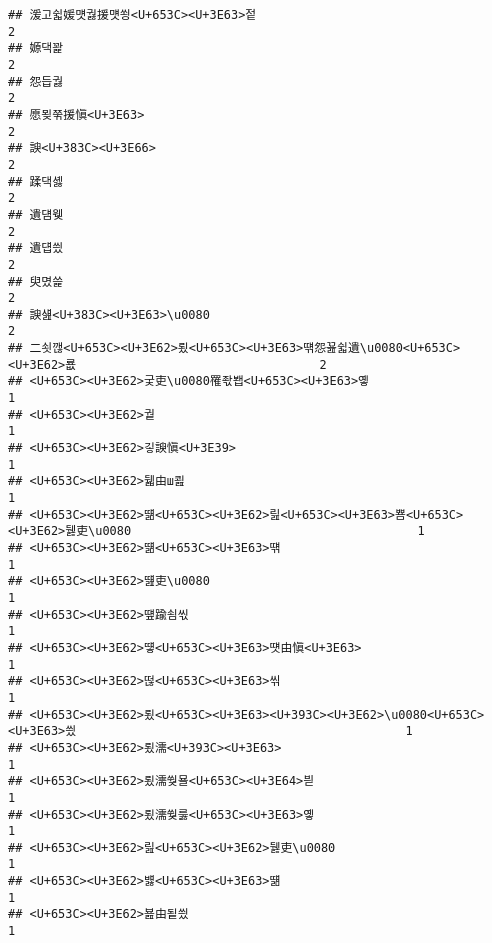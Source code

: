 \documentclass[]{article}
\begin{document}
\begin{verbatim}
## 湲고쉷媛먯궗援먯쑁<U+653C><U+3E63>젙                                                2
## 嫄댁꽕                                                                  2
## 怨듭궗                                                                  2
## 愿묒쭊援愼<U+3E63>                                                            2
## 諛<U+383C><U+3E66>                                                                  2
## 蹂댁셿                                                                  2
## 遺덈웾                                                                  2
## 遺덉씠                                                                  2
## 臾몄쓽                                                                  2
## 諛섎<U+383C><U+3E63>\u0080                                                          2
## 二쇳깮<U+653C><U+3E62>룄<U+653C><U+3E63>떆怨꾪쉷遺\u0080<U+653C><U+3E62>룞                                  2
## <U+653C><U+3E62>궃吏\u0080罹좏봽<U+653C><U+3E63>옣                                              1
## <U+653C><U+3E62>궡                                                                  1
## <U+653C><U+3E62>깋諛愼<U+3E39>                                                            1
## <U+653C><U+3E62>뒓由ш쾶                                                            1
## <U+653C><U+3E62>떎<U+653C><U+3E62>릺<U+653C><U+3E63>뿀<U+653C><U+3E62>뒗吏\u0080                                        1
## <U+653C><U+3E62>떎<U+653C><U+3E63>떆                                                            1
## <U+653C><U+3E62>떒吏\u0080                                                          1
## <U+653C><U+3E62>떞踰쇰씫                                                            1
## <U+653C><U+3E62>떟<U+653C><U+3E63>떗由愼<U+3E63>                                                      1
## <U+653C><U+3E62>떦<U+653C><U+3E63>씪                                                            1
## <U+653C><U+3E62>룄<U+653C><U+3E63><U+393C><U+3E62>\u0080<U+653C><U+3E63>씠                                              1
## <U+653C><U+3E62>룄濡<U+393C><U+3E63>                                                            1
## <U+653C><U+3E62>룄濡쒖묠<U+653C><U+3E64>븯                                                      1
## <U+653C><U+3E62>룄濡쒗룷<U+653C><U+3E63>옣                                                      1
## <U+653C><U+3E62>릺<U+653C><U+3E62>뒗吏\u0080                                                    1
## <U+653C><U+3E62>뱷<U+653C><U+3E63>떎                                                            1
## <U+653C><U+3E62>뵲由됱씠                                                            1

\end{verbatim}
\end{document}

